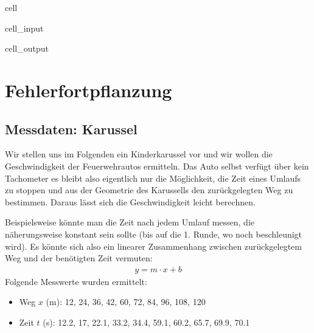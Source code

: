 \documentclass[letterpaper,10pt,english]{jupyterBook}
\begin{document}
\begin{sphinxuseclass}{cell}
\begin{sphinxVerbatimInput}
\begin{sphinxuseclass}{cell_input}
\begin{sphinxVerbatim}[commandchars=\\\{\}]
\end{sphinxVerbatim}

\end{sphinxuseclass}\end{sphinxVerbatimInput}
\begin{sphinxVerbatimOutput}

\begin{sphinxuseclass}{cell_output}
\noindent{}

\end{sphinxuseclass}\end{sphinxVerbatimOutput}

\end{sphinxuseclass}
\sphinxstepscope


\section{Fehlerfortpflanzung}
\label{\detokenize{content/T_Fehlerfortpflanzung:fehlerfortpflanzung}}\label{\detokenize{content/T_Fehlerfortpflanzung::doc}}

\subsection{Messdaten: Karussel}
\label{\detokenize{content/T_Fehlerfortpflanzung:messdaten-karussel}}
\sphinxAtStartPar
Wir stellen uns im Folgenden ein Kinderkarussel vor und wir wollen die Geschwindigkeit der Feuerwehrautos ermitteln. Das Auto selbst verfügt über kein Tachometer \sphinxhyphen{} es bleibt also eigentlich nur die Möglichkeit, die Zeit eines Umlaufs zu stoppen und aus der Geometrie des Karussells den zurückgelegten Weg zu bestimmen. Daraus lässt sich die Geschwindigkeit leicht berechnen.

\sphinxAtStartPar
Beispielsweise könnte man die Zeit nach jedem Umlauf messen, die näherungsweise konstant sein sollte (bis auf die 1. Runde, wo noch beschleunigt wird). Es könnte sich also ein linearer Zusammenhang zwischen zurückgelegtem Weg und der benötigten Zeit vermuten:
\begin{equation*}
\begin{split}y = m\cdot x + b \end{split}
\end{equation*}
\sphinxAtStartPar
Folgende Messwerte wurden ermittelt:
\begin{itemize}
\item {} 
\sphinxAtStartPar
Weg  \(x\) (m): 12, 24, 36, 42, 60, 72, 84, 96, 108, 120

\item {} 
\sphinxAtStartPar
Zeit \(t\) (s): 12.2, 17, 22.1, 33.2, 34.4, 59.1, 60.2, 65.7, 69.9, 70.1

\end{itemize}
\end{document}
